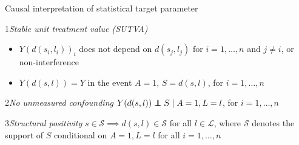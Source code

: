 \documentclass{beamer}
\begin{document}

\begin{frame}[c]{Causal interpretation of statistical target parameter}
\vspace{-0.1cm}
\begin{center}
\begin{tcolorbox}
\begin{assumption}{1}{\textit{Stable unit treatment value (SUTVA)}}\label{sutva}
  \begin{itemize}
    \itemsep2pt
    \item $Y(d(s_i, l_i))_i$ does not depend on $d(s_j, l_j)$ for
        $i = 1, \ldots, n$ and $j \neq i$, or
        non-interference~\citep{cox1958planning, rubin1974estimating}
     \item $Y(d(s, l)) = Y$ in the event $A = 1$, $S = d(s, l)$, for
       $i = 1, \ldots, n$
  \end{itemize}
\end{assumption}
\end{tcolorbox}
\vspace{-0.7em}
\begin{tcolorbox}
\begin{assumption}{2}{\textit{No unmeasured confounding}}\label{ignorability}
  $Y(d(s, l)) \indep S \mid A = 1, L = l$, for $i = 1, \ldots, n$
\end{assumption}
\end{tcolorbox}
\vspace{-0.7em}
\begin{tcolorbox}
\begin{assumption}{3}{\textit{Structural positivity}}\label{positivity}
  $s \in \mathcal{S} \implies d(s, l) \in \mathcal{S}$ for all
  $l \in \mathcal{L}$, where $\mathcal{S}$ denotes the support of $S$
  conditional on $A = 1, L = l$ for all $i = 1, \ldots, n$
\end{assumption}
\end{tcolorbox}
\end{center}


\end{frame}
\end{document}
